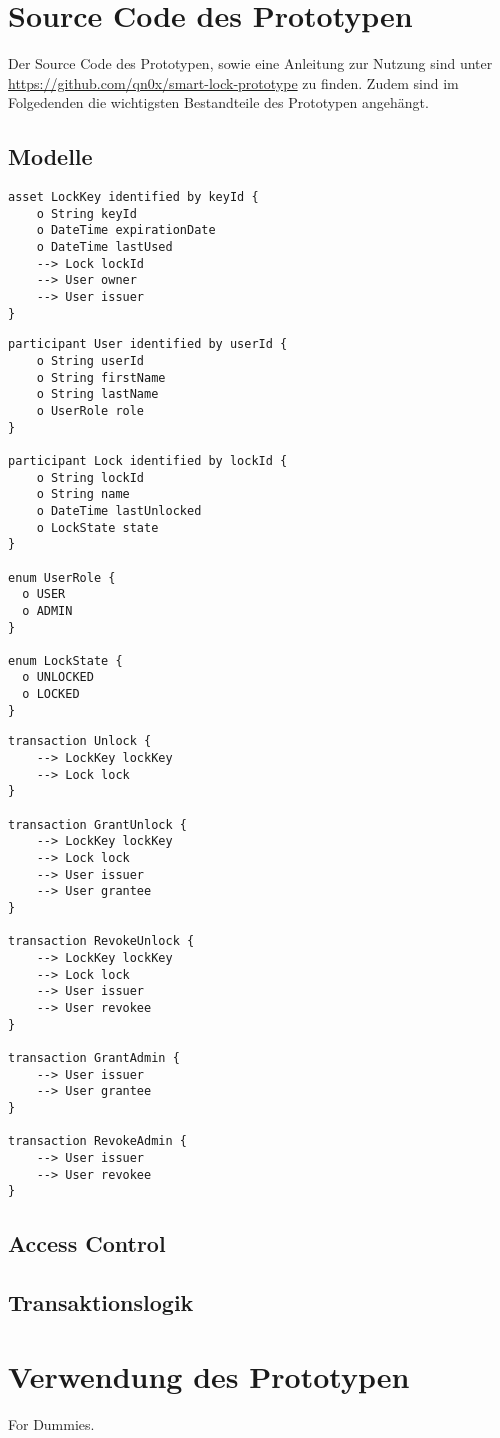 \section{Source Code des Prototypen}
\label{apx:prototype}
    Der Source Code des Prototypen, sowie eine Anleitung zur Nutzung sind unter \sloppy\url{https://github.com/qn0x/smart-lock-prototype} zu finden.
    Zudem sind im Folgedenden die wichtigsten Bestandteile des Prototypen angehängt.
    
    \subsection{Modelle}
        \begin{lstlisting}[caption={Assets},label=model_assets,captionpos=b]
asset LockKey identified by keyId {
    o String keyId
    o DateTime expirationDate
    o DateTime lastUsed
    --> Lock lockId
    --> User owner
    --> User issuer
}
        \end{lstlisting}
        \vspace{1em}
        \begin{lstlisting}[caption={Participants},label=model_participants,captionpos=b]
participant User identified by userId {
    o String userId
    o String firstName
    o String lastName
    o UserRole role
}

participant Lock identified by lockId {
    o String lockId
    o String name
    o DateTime lastUnlocked
    o LockState state
}

enum UserRole {
  o USER
  o ADMIN
}

enum LockState {
  o UNLOCKED
  o LOCKED
}
        \end{lstlisting}
        \vspace{1em}
        \begin{lstlisting}[caption={Transactions},label=model_transactopms,captionpos=b]
transaction Unlock {
    --> LockKey lockKey
    --> Lock lock
}

transaction GrantUnlock {
    --> LockKey lockKey
    --> Lock lock
    --> User issuer
    --> User grantee
}

transaction RevokeUnlock {
    --> LockKey lockKey
    --> Lock lock
    --> User issuer
    --> User revokee
}

transaction GrantAdmin {
    --> User issuer
    --> User grantee
}

transaction RevokeAdmin {
    --> User issuer
    --> User revokee
}
        \end{lstlisting}
    
    \subsection{Access Control}
    \subsection{Transaktionslogik}
\newpage
\section{Verwendung des Prototypen}
    For Dummies. 

